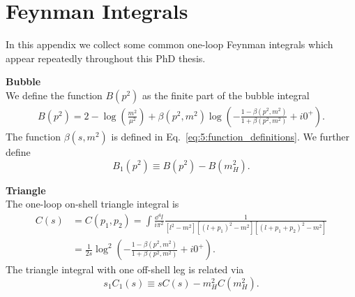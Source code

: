 

\chapter{Feynman Integrals}\label{app:2}

In this appendix we collect some common one-loop Feynman integrals which appear repeatedly throughout this PhD thesis.

\textbf{Bubble}\\
We define the function $B(p^2)$ as the finite part of the bubble integral
\begin{equation}
\begin{split}
B(p^2) = 2 - \log\!\left(\frac{m^2}{ \mu^2} \right) + \beta(p^2, m^2) \log\!\left( - \frac{1 - \beta(p^2, m^2)}{1 + \beta(p^2, m^2)} + i0^+ \right).
\end{split}
\end{equation}
The function $\beta(s, m^2)$ is defined in Eq.~\eqref{eq:5:function_definitions}. We further define
\begin{equation}
B_1(p^2) \equiv B(p^2) - B(m_H^2).
\end{equation}

\textbf{Triangle} \\
The one-loop on-shell triangle integral is
\begin{equation}
\begin{split}
C(s) &= C(p_1, p_2) = \int \frac{\dd^4 l}{i \pi^2} \frac{1}{[l^2 - m^2] [ (l + p_1)^2 - m^2] [(l + p_1 + p_2)^2 - m^2]} \\
&= \frac{1}{2 s} \log^2\!\left( - \frac{1 - \beta(p^2, m^2)}{1 + \beta(p^2, m^2)} + i0^+ \right).
\end{split}
\end{equation}
The triangle integral with one off-shell leg is related via
\begin{equation}
s_1 C_1(s) \equiv s C(s) - m_H^2 C(m_H^2).
\end{equation}

